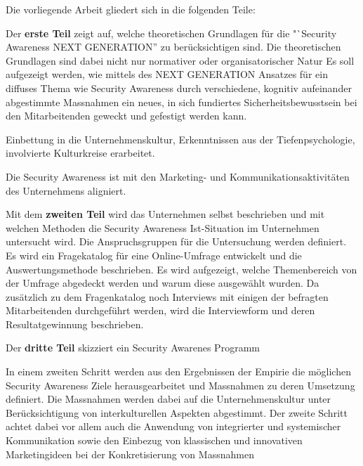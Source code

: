\documentclass[../../main.tex]{subfiles}
\begin{document}
\begin{sloppypar}
Die vorliegende Arbeit gliedert sich in die folgenden Teile:


Der \textbf{erste Teil} zeigt auf, welche theoretischen Grundlagen für die "`Security Awareness NEXT GENERATION'' zu berücksichtigen sind. Die theoretischen Grundlagen sind dabei nicht nur normativer oder organisatorischer Natur Es soll aufgezeigt werden, wie mittels des NEXT GENERATION Ansatzes für ein diffuses Thema wie Security Awareness durch verschiedene, kognitiv aufeinander abgestimmte Massnahmen ein neues, in sich fundiertes Sicherheitsbewusstsein bei den Mitarbeitenden geweckt und gefestigt werden kann.

Einbettung in die Unternehmenskultur, Erkenntnissen aus der Tiefenpsychologie, involvierte Kulturkreise erarbeitet.

Die Security Awareness ist mit den Marketing- und Kommunikationsaktivitäten des Unternehmens aligniert.



Mit dem \textbf{zweiten Teil} wird das Unternehmen \company selbst beschrieben und mit welchen Methoden die Security Awareness Ist-Situation im Unternehmen untersucht wird. Die Anspruchsgruppen für die Untersuchung werden definiert. Es wird ein Fragekatalog für eine Online-Umfrage entwickelt und die Auswertungsmethode beschrieben. Es wird aufgezeigt, welche Themenbereich von der Umfrage abgedeckt werden und warum diese ausgewählt wurden. Da zusätzlich zu dem Fragenkatalog noch Interviews mit einigen der befragten Mitarbeitenden durchgeführt werden, wird die Interviewform und deren Resultatgewinnung beschrieben.



Der \textbf{dritte Teil} skizziert ein Security Awarenes Programm

In einem zweiten Schritt werden aus den Ergebnissen der Empirie die möglichen Security Awareness Ziele herausgearbeitet und Massnahmen zu deren Umsetzung definiert. Die Massnahmen werden dabei auf die Unternehmenskultur unter Berücksichtigung von interkulturellen Aspekten abgestimmt. Der zweite Schritt achtet dabei vor allem auch die Anwendung von integrierter und systemischer Kommunikation sowie den Einbezug von klassischen und innovativen Marketingideen bei der Konkretisierung von Massnahmen



\end{sloppypar}
\end{document}
